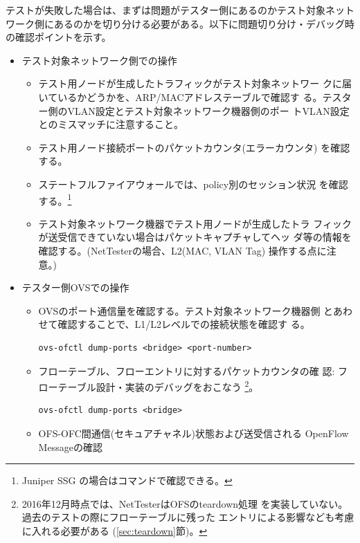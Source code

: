 テストが失敗した場合は、まずは問題がテスター側にあるのかテスト対象ネット
ワーク側にあるのかを切り分ける必要がある。以下に問題切り分け・デバッグ時
の確認ポイントを示す。
\begin{itemize}
 \item テスト対象ネットワーク側での操作
       \begin{itemize}
        \item テスト用ノードが生成したトラフィックがテスト対象ネットワー
              クに届いているかどうかを、ARP/MACアドレステーブルで確認す
              る。テスター側のVLAN設定とテスト対象ネットワーク機器側のポー
              トVLAN設定とのミスマッチに注意すること。
        \item テスト用ノード接続ポートのパケットカウンタ(エラーカウンタ)
              を確認する。
        \item ステートフルファイアウォールでは、policy別のセッション状況
              を確認する。\footnote{Juniper SSG の場合はコマンドで確認できる。}
        \item テスト対象ネットワーク機器でテスト用ノードが生成したトラ
              フィックが送受信できていない場合はパケットキャプチャしてヘッ
              ダ等の情報を確認する。(NetTesterの場合、L2(MAC, VLAN Tag)
              操作する点に注意。)
       \end{itemize}
 \item テスター側OVSでの操作
       \begin{itemize}
        \item OVSのポート通信量を確認する。テスト対象ネットワーク機器側
              とあわせて確認することで、L1/L2レベルでの接続状態を確認す
              る。
\begin{lstlisting}
ovs-ofctl dump-ports <bridge> <port-number>
\end{lstlisting}
        \item フローテーブル、フローエントリに対するパケットカウンタの確
              認: フローテーブル設計・実装のデバッグをおこなう
              \footnote{2016年12月時点では、NetTesterはOFSのteardown処理
              を実装していない。過去のテストの際にフローテーブルに残った
              エントリによる影響なども考慮に入れる必要がある
              (\ref{sec:teardown}節)。}。
\begin{lstlisting}
ovs-ofctl dump-ports <bridge>
\end{lstlisting}
        \item OFS-OFC間通信(セキュアチャネル)状態および送受信される
              OpenFlow Messageの確認

\end{itemize}
\end{itemize}
